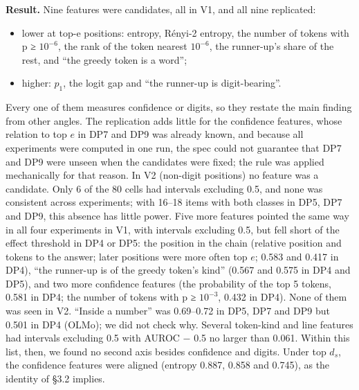 \documentclass[
  10pt,
  a4paper,
]{article}
\providecommand{\tightlist}{%
  \setlength{\itemsep}{0pt}\setlength{\parskip}{0pt}}
\begin{document}
\textbf{Result.} Nine features were candidates, all in V1, and all nine replicated:

\begin{itemize}
\tightlist
\item
  lower at top-e positions: entropy, Rényi-2 entropy, the number of tokens with p ≥ \(10^{-6}\), the rank of the token nearest \(10^{-6}\), the runner-up's share of the rest, and ``the greedy token is
  a word'';
\item
  higher: \(p_1\), the logit gap and ``the runner-up is digit-bearing''.
\end{itemize}

Every one of them measures confidence or digits, so they restate the main finding from other angles. The replication adds little for the confidence features, whose relation to top \(e\) in DP7 and DP9
was already known, and because all experiments were computed in one run, the spec could not guarantee that DP7 and DP9 were unseen when the candidates were fixed; the rule was applied mechanically for
that reason. In V2 (non-digit positions) no feature was a candidate. Only 6 of the 80 cells had intervals excluding 0.5, and none was consistent across experiments; with 16--18 items with both classes
in DP5, DP7 and DP9, this absence has little power. Five more features pointed the same way in all four experiments in V1, with intervals excluding 0.5, but fell short of the effect threshold in DP4
or DP5: the position in the chain (relative position and tokens to the answer; later positions were more often top \(e\); 0.583 and 0.417 in DP4), ``the runner-up is of the greedy token's kind''
(0.567 and 0.575 in DP4 and DP5), and two more confidence features (the probability of the top 5 tokens, 0.581 in DP4; the number of tokens with p ≥ \(10^{-3}\), 0.432 in DP4). None of them was seen
in V2. ``Inside a number'' was 0.69--0.72 in DP5, DP7 and DP9 but 0.501 in DP4 (OLMo); we did not check why. Several token-kind and line features had intervals excluding 0.5 with \textbar AUROC −
0.5\textbar{} no larger than 0.061. Within this list, then, we found no second axis besides confidence and digits. Under top \(d_{s}\), the confidence features were aligned (entropy 0.887, 0.858 and
0.745), as the identity of §3.2 implies.
\end{document}

